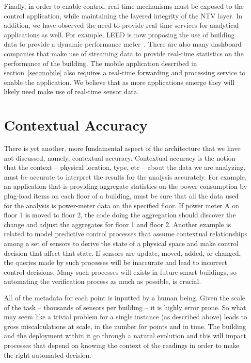 Finally, in order to enable control, real-time mechanisms must be exposed to the control application, while maintaining the 
layered integrity of the NTV layer.  In addition, we have observed the need to provide real-time services for analytical applications
as well.  For example, LEED is now proposing the use of building data to provide a dynamic performance meter~\cite{DynamicLeed}.
There are also many dashboard companies that make use of streaming data to provide real-time statistics on the performance of the
building.  The mobile application described in section~\ref{sec:mobile} also requires a real-time forwarding and processing service to
enable the application.  We believe that as more applications emerge they will likely need make use of real-time sensor data.

\section{Contextual Accuracy}
There is yet another, more fundamental aspect of the architecture that we have not discussed, namely, contextual accuracy.
Contextual accuracy is the notion that the context -- physical location, type, etc -- about the data we are analyzing, must be accurate
to interpret the results for the analysis accurately.  For example, an application that is providing aggregate statistics on the 
power consumption by plug-load items on each floor of a building, must be sure that all the data used for the analysis 
is power-meter data on the specified floor.  If power meter A on floor 1 is moved to floor 2, the code doing the aggregation
should discover the change and adjust the aggregates for floor 1 and floor 2.  Another example is related to model predictive 
control processes that assume contextual relationships among a set of sensors to derive the state of a physical space and 
make control decision that affect that state.  If sensors are update, moved, added, or changed, the queries made by such processes
will be inaccurate and lead to incorrect control decisions.  Many such processes will exists in future smart buildings, so
automating the verification process as much as possible, is crucial.

All of the metadata for each point is inputted by a human being.  Given the scale of the task -- thousands of sensors per building --
it is highly error prone.  So what may seem like a trivial problem for a single instance (as described above) leads to gross
miscalculations at scale, in the number for points and in time.  The building and the deployment within it go through a natural
evolution and this will impact processes that depend on knowing the context of the readings in order to make the right automated decision.

